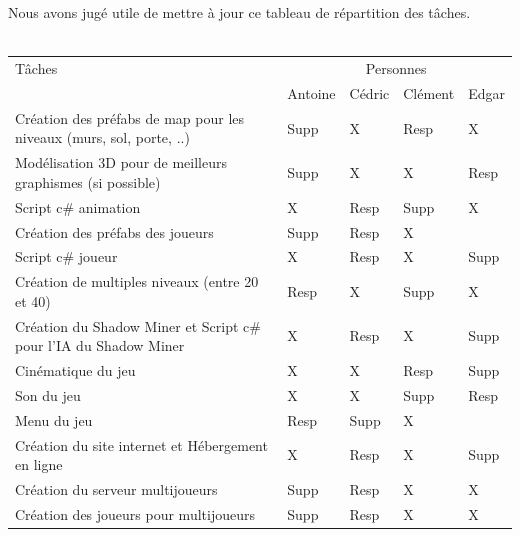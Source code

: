 \documentclass[titlepage, 13px, a4paper]{report}
\begin{document}
\paragraph{} \hspace{0pt} \\ 
Nous avons jugé utile de mettre à jour ce tableau de répartition des tâches.
\\ \\
{\normalsize
	\begin{tabular}{|p{6cm}|p{1.2cm}|p{1.2cm}|p{1.2cm}|p{1.2cm}|}
		\hline
		Tâches & \multicolumn{4}{|c|}{Personnes} \\ 
		\cline{2-5}
			& Antoine & Cédric & Clément & Edgar \\
		\hline
		Création des préfabs de map pour les niveaux (murs, sol, porte, ..) & Supp\footnotemark[2] & X & Resp\footnotemark[1] & X \\
		\hline
		Modélisation 3D pour de meilleurs graphismes (si possible) & Supp\footnotemark[2] & X & X & Resp\footnotemark[1] \\
		\hline
		Script c\# animation & X & Resp\footnotemark[1] & Supp\footnotemark[2] & X \\
		\hline
		Création des préfabs des joueurs & Supp\footnotemark[2] & Resp\footnotemark[1] & X &  \\
		\hline
		Script c\# joueur & X & Resp\footnotemark[1] & X & Supp\footnotemark[2] \\
		\hline
		Création de multiples niveaux (entre 20 et 40) & Resp\footnotemark[1] & X & Supp\footnotemark[2] & X \\
		\hline
		Création du Shadow Miner et Script c\# pour l'IA du Shadow Miner & X & Resp\footnotemark[1] & X & Supp\footnotemark[2] \\
		\hline
		Cinématique du jeu & X & X & Resp\footnotemark[1] & Supp\footnotemark[2] \\
		\hline
		Son du jeu & X & X & Supp\footnotemark[2] & Resp\footnotemark[1] \\
		\hline
		Menu du jeu & Resp\footnotemark[1] & Supp\footnotemark[2] & X & \\
		\hline
		Création du site internet et Hébergement en ligne & X & Resp\footnotemark[1] & X & Supp\footnotemark[2] \\
		\hline
		Création du serveur multijoueurs & Supp\footnotemark[2] & Resp\footnotemark[1] & X & X \\
		\hline
		Création des joueurs pour multijoueurs & Supp\footnotemark[2] & Resp\footnotemark[1] & X & X \\

\end{tabular}}
\end{document}
